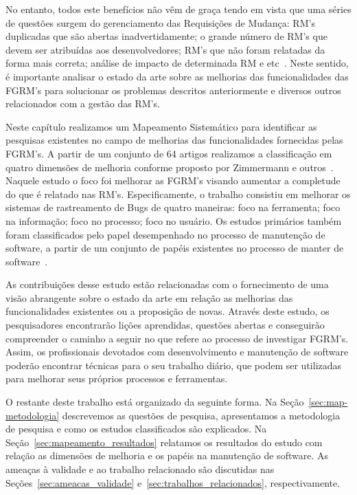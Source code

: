 No entanto, todos este benefícios não vêm de graça tendo em vista que uma séries
de questões surgem do gerenciamento das Requisições de Mudança: RM's duplicadas
que são abertas inadvertidamente; o grande número de RM's que devem ser
atribuídas aos desenvolvedores; RM's que não foram relatadas da forma mais
correta; análise de impacto de determinada RM e
etc~\cite{cavalcanti2014challenges}. Neste sentido, é importante analisar o
estado da arte sobre as melhorias das funcionalidades das FGRM's para solucionar
os problemas descritos anteriormente e diversos outros relacionados com a gestão
das RM's.

Neste capítulo realizamos um Mapeamento Sistemático para identificar as
pesquisas existentes no campo de melhorias das funcionalidades fornecidas pelas
FGRM's. A partir de um conjunto de 64 artigos realizamos a classificação em
quatro dimensões de melhoria conforme proposto por Zimmermann e
outros~\cite{zimmermann2009improving}. Naquele estudo o foco foi melhorar as
FGRM's visando aumentar a completude do que é relatado nas RM's.
Especificamente, o trabalho consistiu em melhorar os sistemas de rastreamento de
Bugs de quatro maneiras: foco na ferramenta; foco na informação; foco no
processo; foco no usuário. Os estudos primários também  foram classificados pelo
papel desempenhado no processo de manutenção de software, a partir de um
conjunto de papéis existentes no processo de manter de
software~\cite{Polo1999}.

As contribuições desse estudo estão relacionadas com o fornecimento de uma visão
abrangente sobre o estado da arte em relação as melhorias das funcionalidades
existentes ou a proposição de novas. Através deste estudo, os pesquisadores
encontrarão lições aprendidas, questões abertas e conseguirão compreender o
caminho a seguir no que refere ao processo de investigar FGRM's. Assim, os
profissionais devotados com desenvolvimento e manutenção de software poderão
encontrar técnicas para o seu trabalho diário, que podem ser utilizadas para
melhorar seus próprios processos e ferramentas.

O restante deste trabalho está organizado da seguinte forma. Na
Seção~\ref{sec:map-metodologia} descrevemos as questões de pesquisa,
apresentamos a metodologia de pesquisa e como os estudos classificados são
explicados.  Na Seção~\ref{sec:mapeamento_resultados} relatamos os resultados do
estudo com relação as dimensões de melhoria e os papéis na manutenção de
software. As ameaças à validade e ao trabalho relacionado são discutidas nas
Seções~\ref{sec:ameacas_validade} e~\ref{sec:trabalhos_relacionados},
respectivamente.

